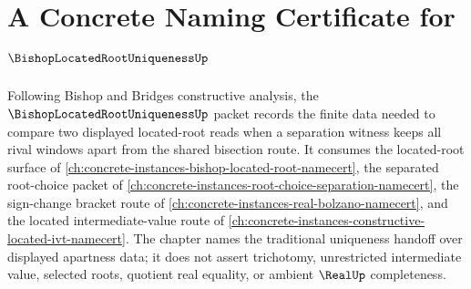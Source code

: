 \chapter{A Concrete Naming Certificate for $\BishopLocatedRootUniquenessUp$}
\label{ch:concrete-instances-bishop-located-root-uniqueness-namecert}

Following Bishop and Bridges constructive analysis, the $\BishopLocatedRootUniquenessUp$ packet records the finite data needed to compare two displayed located-root reads when a separation witness keeps all rival windows apart from the shared bisection route. It consumes the located-root surface of \autoref{ch:concrete-instances-bishop-located-root-namecert}, the separated root-choice packet of \autoref{ch:concrete-instances-root-choice-separation-namecert}, the sign-change bracket route of \autoref{ch:concrete-instances-real-bolzano-namecert}, and the located intermediate-value route of \autoref{ch:concrete-instances-constructive-located-ivt-namecert}. The chapter names the traditional uniqueness handoff over displayed apartness data; it does not assert trichotomy, unrestricted intermediate value, selected roots, quotient real equality, or ambient $\RealUp$ completeness.


